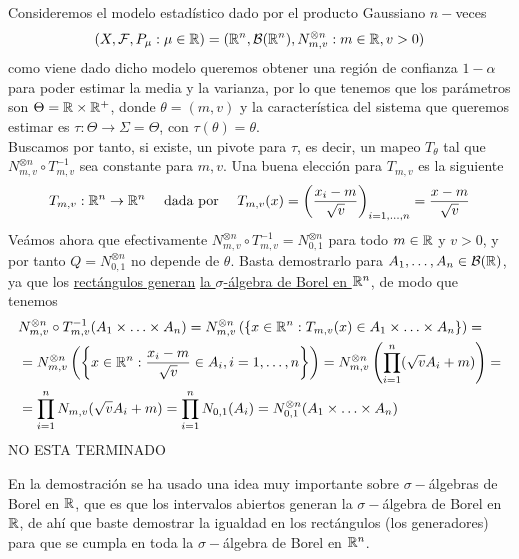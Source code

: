 \begin{ejemplo}
    Consideremos el modelo estadístico dado por el producto Gaussiano $n-$veces
    \begin{equation*}
        (X, \mathcal{F}, P_{\mu}: \mu \in \mathbb{R}) = ( \mathbb{R}^n, \mathcal{B}(\mathbb{R}^n), N_{m,v}^{\otimes n} : m \in \mathbb{R},v>0)
    \end{equation*}
    como viene dado dicho modelo queremos obtener una región de confianza $1-\alpha$ para poder estimar la media y la varianza, por lo que tenemos que los parámetros son $\Theta = \mathbb{R} \times \mathbb{R}^+$, donde $\theta=(m,v)$ y la característica del sistema que queremos estimar es $\tau: \Theta \to \Sigma=\Theta$, con $\tau(\theta) = \theta$. \\ 
    Buscamos por tanto, si existe, un pivote para $\tau$, es decir, un mapeo $T_{\theta}$ tal que $N_{m,v}^{\otimes n} \circ T_{m,v}^{-1}$ sea constante para $m,v$. Una buena elección para $T_{m,v}$ es la siguiente
    \begin{equation*}
        T_{m,v}:\mathbb{R}^n\to \mathbb{R}^n \quad \text{ dada por } \quad T_{m,v}(x)=\left(\dfrac{x_i-m}{\sqrt{v}}\right)_{i=1,\ldots,n}=\dfrac{x-m}{\sqrt{v}}
    \end{equation*}
    Veámos ahora que efectivamente $N_{m,v}^{\otimes n} \circ T_{m,v}^{-1}=N_{0,1}^{\otimes n}$ para todo $m\in \mathbb{R}$ y $v>0$, y por tanto $Q=N_{0,1}^{\otimes n}$ no depende de $\theta$. Basta demostrarlo para $A_1, \ldots, A_n \in \mathcal{B}(\mathbb{R})$, ya que los \underline{rectángulos generan} \underline{la $\sigma$-álgebra de Borel en $\mathbb{R}^n$}, de modo que tenemos
    \begin{align*}
        & N_{m,v}^{\otimes n} \circ T_{m,v}^{-1}(A_1 \times \ldots \times A_n) = N_{m,v}^{\otimes n}\left(\left\{x \in \mathbb{R}^n : T_{m,v}(x) \in A_1 \times \ldots \times A_n\right\}\right) = \\
        & = N_{m,v}^{\otimes n}\left(\left\{x \in \mathbb{R}^n : \dfrac{x_i - m}{\sqrt{v}} \in A_i, i=1,\ldots,n\right\}\right) = N_{m,v}^{\otimes n}\left(\prod\limits_{i=1}^{n} (\sqrt{v} A_i + m)\right) = \\
        & = \prod\limits_{i=1}^{n} N_{m,v}(\sqrt{v} A_i + m) = \prod\limits_{i=1}^{n} N_{0,1}(A_i) = N_{0,1}^{\otimes n}(A_1 \times \ldots \times A_n)
    \end{align*}
    NO ESTA TERMINADO
\end{ejemplo}

\begin{observacion}
    En la demostración se ha usado una idea muy importante sobre $\sigma-$álgebras de Borel en $\mathbb{R}$, que es que los intervalos abiertos generan la $\sigma-$álgebra de Borel en $\mathbb{R}$, de ahí que baste demostrar la igualdad en los rectángulos (los generadores) para que se cumpla en toda la $\sigma-$álgebra de Borel en $\mathbb{R}^n$.
\end{observacion}